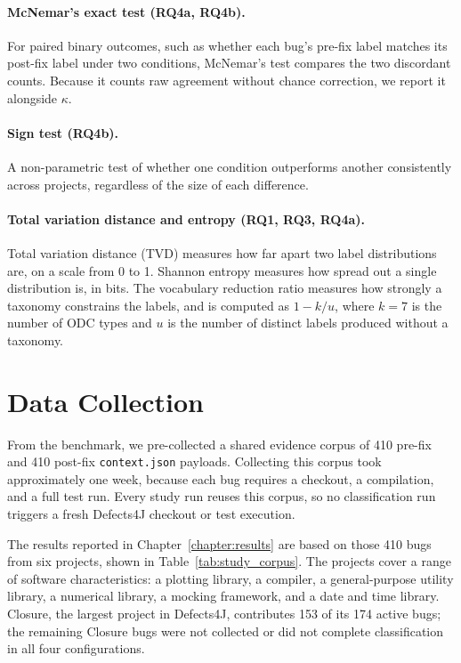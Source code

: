 \documentclass{iutbscthesis}
\begin{document}
\paragraph{McNemar's exact test (RQ4a, RQ4b).} For paired binary outcomes, such as whether each bug's pre-fix label matches its post-fix label under two conditions, McNemar's test compares the two discordant counts. Because it counts raw agreement without chance correction, we report it alongside $\kappa$.

\paragraph{Sign test (RQ4b).} A non-parametric test of whether one condition outperforms another consistently across projects, regardless of the size of each difference.

\paragraph{Total variation distance and entropy (RQ1, RQ3, RQ4a).} Total variation distance (TVD) measures how far apart two label distributions are, on a scale from 0 to 1. Shannon entropy measures how spread out a single distribution is, in bits. The vocabulary reduction ratio measures how strongly a taxonomy constrains the labels, and is computed as $1 - k/u$, where $k = 7$ is the number of ODC types and $u$ is the number of distinct labels produced without a taxonomy.

\section{Data Collection}

From the benchmark, we pre-collected a shared evidence corpus of 410 pre-fix and 410 post-fix \texttt{context.json} payloads. Collecting this corpus took approximately one week, because each bug requires a checkout, a compilation, and a full test run. Every study run reuses this corpus, so no classification run triggers a fresh Defects4J checkout or test execution.

The results reported in Chapter~\ref{chapter:results} are based on those 410 bugs from six projects, shown in Table~\ref{tab:study_corpus}. The projects cover a range of software characteristics: a plotting library, a compiler, a general-purpose utility library, a numerical library, a mocking framework, and a date and time library. Closure, the largest project in Defects4J, contributes 153 of its 174 active bugs; the remaining Closure bugs were not collected or did not complete classification in all four configurations.
\end{document}
